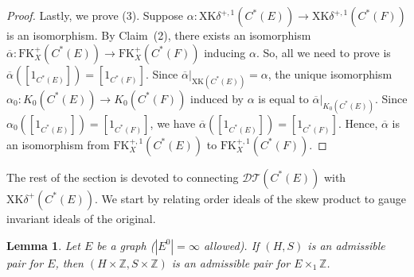 \documentclass[12pt]{amsbook}%
\newtheorem{lemma}[theor]{Lemma}
\theoremstyle{defin}
\theoremstyle{remark}
\numberwithin{equation}{chapter}
\numberwithin{theor}{section}
\newcommand{\ZZ}{\mathbb{Z}}
\newcommand{\DT}{\mathcal{DT}}
\begin{document}
\begin{proof}
Lastly, we prove (3).  Suppose $\alpha \colon \mathrm{XK}\delta^{+,1} ( C^*(E) ) \to \mathrm{XK}\delta^{+,1} ( C^*(F) )$ is an isomorphism.  By Claim~(2), there exists an isomorphism $\overline{\alpha} \colon \mathrm{FK}_X^+(C^*(E)) \to \mathrm{FK}_X^+(C^*(F))$ inducing $\alpha$.  So, all we need to prove is $\overline{\alpha}( [1_{C^*(E)}]) = [1_{C^*(F)}]$.  Since $\overline{\alpha} \vert_{ \mathrm{XK}(C^*(E))} = \alpha$, the unique isomorphism $\alpha_0 \colon K_0(C^*(E)) \to K_0(C^*(F))$ induced by $\alpha$ is equal to $\overline{\alpha}\vert_{ K_0(C^*(E))}$.  Since $\alpha_0( [1_{C^*(E)}]) = [1_{C^*(F)}]$, we have $\overline{\alpha}( [1_{C^*(E)}]) = [1_{C^*(F)}]$.  Hence, $\overline{\alpha}$ is an isomorphism from $\mathrm{FK}_X^{+,1}(C^*(E))$ to $\mathrm{FK}_X^{+,1}(C^*(F))$.
\end{proof}


The rest of the section is devoted to connecting $\DT(C^*(E))$ with $\mathrm{XK}\delta^+(C^*(E))$.  We start by relating order ideals of the skew product to gauge invariant  ideals of the original.  





\begin{lemma}\label{lem-adm-pair-skew-prod}
Let $E$ be a graph ($|E^0|=\infty$ allowed).  If $(H, S)$ is an admissible pair for $E$, then $( H \times \ZZ , S \times \ZZ )$ is an admissible pair for $E \times_1 \ZZ$. 
\end{lemma}
\end{document}

